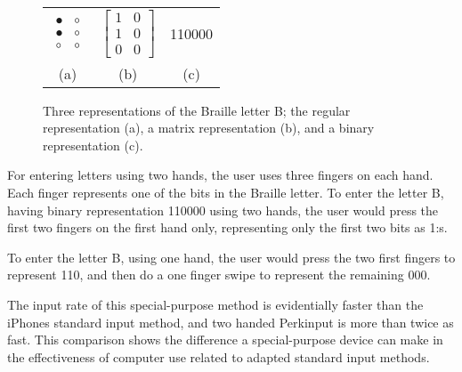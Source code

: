 \begin{figure}[h!]
\centering

\begin{tabular}{c c c}

$
\begin{array}{cc}
\bullet & \circ \\
\bullet & \circ \\
\circ & \circ \end{array}
$

&

$
\left[ \begin{array}{cc}
1 & 0 \\
1 & 0 \\
0 & 0 \end{array} \right]
$ 

&

110000 \\

(a) & (b) & (c)

\end{tabular}


\caption{Three representations of the Braille letter B; the regular representation (a), a matrix representation (b), and a binary representation (c).}
\label{fig:brailleexample}


\end{figure}


For entering letters using two hands, the user uses three fingers on each hand. Each finger represents one of the bits in the Braille letter. To enter the letter B, having binary representation 110000 using two hands, the user would press the first two fingers on the first hand only, representing only the first two bits as 1:s.

To enter the letter B, using one hand, the user would press the two first fingers to represent 110, and then do a one finger swipe to represent the remaining 000.

The input rate of this special-purpose method is evidentially faster than the iPhones standard input method\cite{azenkot}, and two handed Perkinput is more than twice as fast. This comparison shows the difference a special-purpose device can make in the effectiveness of computer use related to adapted standard input methods. 

